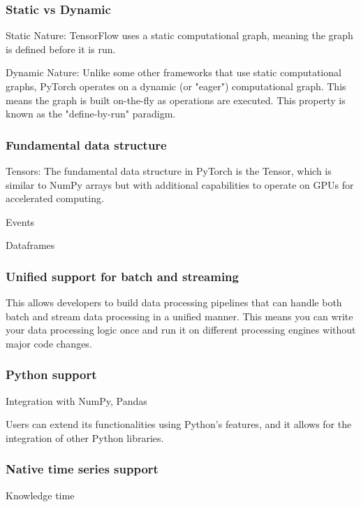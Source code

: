 \documentclass[11pt, reqno]{amsart}
\theoremstyle{definition}
\theoremstyle{remark}
\begin{document}
\subsubsection{Static vs Dynamic}
Static Nature: TensorFlow uses a static computational graph, meaning the graph
is defined before it is run.

Dynamic Nature: Unlike some other frameworks that use static computational
graphs, PyTorch operates on a dynamic (or "eager") computational graph. This
means the graph is built on-the-fly as operations are executed. This property
is known as the "define-by-run" paradigm.

\subsubsection{Fundamental data structure}
Tensors: The fundamental data structure in PyTorch is the Tensor, which is
similar to NumPy arrays but with additional capabilities to operate on GPUs for
accelerated computing.

Events

Dataframes

\subsubsection{Unified support for batch and streaming}
This allows developers to build data processing pipelines that can handle both
batch and stream data processing in a unified manner. This means you can write
your data processing logic once and run it on different processing engines
without major code changes.

\subsubsection{Python support}
Integration with NumPy, Pandas

Users can extend its functionalities using Python’s features, and it allows for
the integration of other Python libraries.

\subsubsection{Native time series support}
Knowledge time
\end{document}
